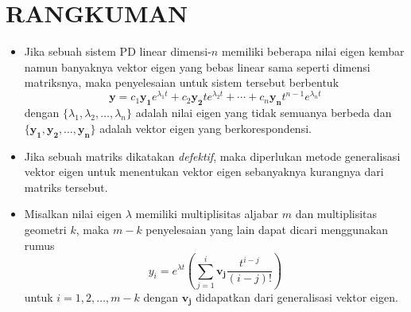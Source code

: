 \documentclass[a4paper]{article}
\theoremstyle{definisi}
\numberwithin{equation}{section}
\begin{document}
  \section*{RANGKUMAN}
  \begin{itemize}
    \item Jika sebuah sistem PD linear dimensi-$n$ memiliki beberapa nilai eigen kembar namun banyaknya vektor eigen yang bebas linear sama seperti dimensi matriksnya, maka penyelesaian untuk sistem tersebut berbentuk
    \begin{equation*}
      \mathbf{y}=c_1\mathbf{y_1}e^{\lambda_1 t}+c_2\mathbf{y_2}te^{\lambda_2 t}+\cdots+c_n\mathbf{y_n}t^{n-1}e^{\lambda_n t}
    \end{equation*}
    dengan $\{\lambda_1,\lambda_2,\ldots,\lambda_n\}$ adalah nilai eigen yang tidak semuanya berbeda dan $\{\mathbf{y_1},\mathbf{y_2},\ldots,\mathbf{y_n}\}$ adalah vektor eigen yang berkorespondensi.
    \item Jika sebuah matriks dikatakan \textit{defektif}, maka diperlukan metode generalisasi vektor eigen untuk menentukan vektor eigen sebanyaknya kurangnya dari matriks tersebut.
    \item Misalkan nilai eigen $\lambda$ memiliki multiplisitas aljabar $m$ dan multiplisitas geometri $k$, maka $m-k$ penyelesaian yang lain dapat dicari menggunakan rumus
    \begin{equation*}
      y_{i}=e^{\lambda t}\left(\sum_{j=1}^{i} \mathbf{v_{j}}\frac{t^{i-j}}{(i-j)!}\right)
    \end{equation*}
    untuk $i=1,2,\ldots,m-k$ dengan $\mathbf{v_{j}}$ didapatkan dari generalisasi vektor eigen.
  \end{itemize}
  \newpage
\end{document}
